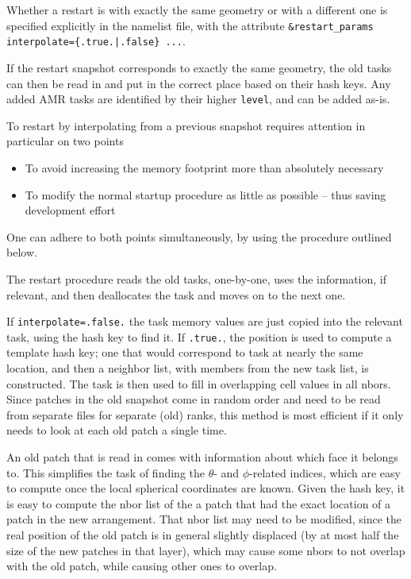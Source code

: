 \documentclass[paper=a4,fontsize=11pt]{scrartcl}
\numberwithin{equation}{section}		%
\numberwithin{figure}{section}			%
\numberwithin{table}{section}				%
\begin{document}
Whether a restart is with exactly the same geometry or with a different one is specified explicitly in the namelist file, with the attribute \verb:&restart_params interpolate={.true.|.false} ...:.

If the restart snapshot corresponds to exactly the same geometry, the old tasks can then be read in and put in the correct place based on their hash keys.   Any added AMR tasks are identified by their higher \verb|level|, and can be added as-is.

To restart by interpolating from a previous snapshot requires attention in particular on two points
\begin{itemize}
    \item To avoid increasing the memory footprint more than absolutely necessary
    \item To modify the normal startup procedure as little as possible -- thus saving development effort
\end{itemize}
One can adhere to both points simultaneously, by using the procedure outlined below.

The restart procedure reads the old tasks, one-by-one, uses the information, if relevant, and then deallocates the task and moves on to the next one.  

If \verb|interpolate=.false.| the task memory values are just copied into the relevant task, using the hash key to find it.  If \verb|.true.|, the position is used to compute a template hash key; one that would correspond to task at nearly the same location, and then a neighbor list, with members from the new task list, is constructed.   The task is then used to fill in overlapping cell values in all nbors. Since patches in the old snapshot come in random order and need to be read from separate files for separate (old) ranks, this method is most efficient if it only needs to look at each old patch a single time.

An old patch that is read in comes with information about which face it belongs to.  This simplifies the task of finding the $\theta$- and $\phi$-related indices, which are easy to compute once the local spherical coordinates are known.  Given the hash key, it is easy to compute the nbor list of the a patch that had the exact location of a patch in the new arrangement. That nbor list may need to be modified, since the real position of the old patch is in general slightly displaced (by at most half the size of the new patches in that layer), which may cause some nbors to not overlap with the old patch, while causing other ones to overlap.
\end{document}
